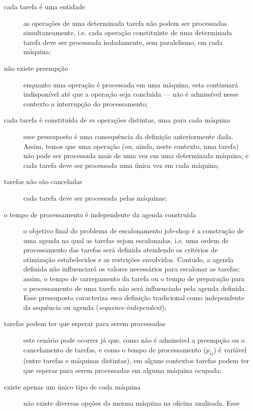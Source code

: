 \documentclass[relatorio,nocolorlinks]{inf-ufg}
\begin{document}
\begin{description}
\item[cada tarefa \'{e} uma entidade] as opera\c{c}\~{o}es de uma determinada tarefa n\~{a}o podem ser processadas simultaneamente, i.e. cada
opera\c{c}\~{a}o constituinte de uma determinada tarefa deve ser processada isoladamente, sem paralelismo, em cada m\'{a}quina;
\item[n\~{a}o existe preemp\c{c}\~{a}o] enquanto uma opera\c{c}\~{a}o \'{e} processada em uma m\'{a}quina, esta continuar\'{a} indispon\'{i}vel
at\'{e} que a opera\c{c}\~{a}o seja conclu\'{i}da --- n\~{a}o \'{e} admiss\'{i}vel nesse contexto a interrup\c{c}\~{a}o do processamento;
\item[cada tarefa \'{e} constitu\'{i}da de $m$ opera\c{c}\~{o}es distintas, uma para cada m\'{a}quina] esse pressuposto \'{e} uma consequ\^{e}ncia
da defini\c{c}\~{a}o anteriormente dada. Assim, temos que uma opera\c{c}\~{a}o (ou, ainda, neste contexto, uma tarefa) n\~{a}o pode ser processada
mais de uma vez em uma determinada m\'{a}quina; e cada tarefa deve ser processada uma \'{u}nica vez em cada m\'{a}quina;
\item[tarefas n\~{a}o s\~{a}o canceladas] cada tarefa deve ser processada pelas m\'{a}quinas;
\item[o tempo de processamento \'{e} independente da agenda constru\'{i}da] o objetivo final do problema de escalonamento job-shop \'{e} a
constru\c{c}\~{a}o de uma agenda na qual as tarefas sejam escalonadas, i.e. uma ordem de processamento das tarefas ser\'{a} definida atendendo os
crit\'{e}rios de otimiza\c{c}\~{a}o estabelecidos e as restri\c{c}\~{o}es envolvidas. Contudo, a agenda definida n\~{a}o influenciar\'{a} os
valores necess\'{a}rios para escalonar as tarefas; assim, o tempo de carregamento da tarefa ou o tempo de prepara\c{c}\~{a}o para o processamento
de uma tarefa n\~{a}o ser\'{a} influenciado pela agenda definida. Esse pressuposto caracteriza essa defini\c{c}\~{a}o tradicional como
independente da sequ\^{e}ncia ou agenda (\textit{sequence-independent});
\item[tarefas podem ter que esperar para serem processadas] este cen\'{a}rio pode ocorrer j\'{a} que, como n\~{a}o \'{e} admiss\'{i}vel a
preemp\c{c}\~{a}o ou o cancelamento de tarefas, e como o tempo de processamento ($p_{ij}$) \'{e} vari\'{a}vel (entre tarefas e m\'{a}quinas
distintas), em alguns contextos tarefas podem ter que esperar para serem processadas em alguma m\'{a}quina ocupada;
\item[existe apenas um \'{u}nico tipo de cada m\'{a}quina] n\~{a}o existe diversas op\c{c}\~{o}es da mesma m\'{a}quina na oficina analisada. Esse

\end{description}
\end{document}
